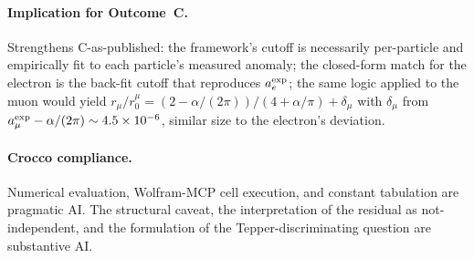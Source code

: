 \paragraph{Implication for Outcome~C.}
Strengthens C-as-published: the framework's cutoff is necessarily per-particle
and empirically fit to each particle's measured anomaly; the closed-form
match for the electron is the back-fit cutoff that reproduces $a_e^{\rm exp}$;
the same logic applied to the muon would yield
$r_\mu/r_0^\mu = (2 - \alpha/(2\pi))/(4 + \alpha/\pi) + \delta_\mu$ with
$\delta_\mu$ from $a_\mu^{\rm exp} - \alpha/(2\pi) \sim 4.5\times 10^{-6}$,
similar size to the electron's deviation.

\paragraph{Crocco compliance.}
Numerical evaluation, Wolfram-MCP cell execution, and constant tabulation are
pragmatic AI. The structural caveat, the interpretation of the residual as
not-independent, and the formulation of the Tepper-discriminating question
are substantive AI.

